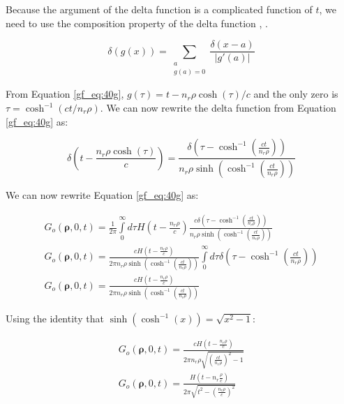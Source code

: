 Because the argument of the delta function is a complicated function of $t$, we need to use the composition property of the delta function \cite{arfken_weber}, \cite{gbur_math}.

 \begin{equation}
\delta\left(g(x) \right) = \sum_{\substack{a \\g(a)=0}}\frac{\delta(x-a)}{|g'(a)|}
\label{gf_eq:40h}
\end{equation}
 \renewcommand{\baselinestretch}{2} \small\normalsize
 
From Equation \ref{gf_eq:40g}, $g(\tau) = t - n_r\rho\cosh(\tau)/c$ and the only zero  is $\tau = \cosh^{-1}\left(ct/n_r\rho\right)$. We can now rewrite the delta function from Equation \ref{gf_eq:40g} as:

 \begin{equation}
\delta\left(t - \frac{n_r\rho \cosh(\tau)}{c}\right) = \frac{\delta\left(\tau -\cosh^{-1}\left(\frac{ct}{n_r\rho} \right) \right)}{n_r\rho\sinh\left(\cosh^{-1}\left(\frac{ct}{n_r\rho} \right) \right)}
\label{gf_eq:40i}
\end{equation}
 \renewcommand{\baselinestretch}{2} \small\normalsize
 
\noindent We can now rewrite Equation \ref{gf_eq:40g} as:

 \begin{equation}
 \begin{gathered}
G_o\left(\boldsymbol{\rho},0,t\right) = \frac{1}{2\pi}\int\limits_{0}^{\infty}d\tau H\left(t -\frac{n_r\rho}{c}\right)  \frac{c\delta\left(\tau -\cosh^{-1}\left(\frac{ct}{n_r\rho} \right) \right)}{n_r\rho\sinh\left(\cosh^{-1}\left(\frac{ct}{n_r\rho} \right) \right)}\\
G_o\left(\boldsymbol{\rho},0,t\right) = \frac{cH\left(t -\frac{n_r\rho}{c}\right)}{2\pi n_r\rho\sinh\left(\cosh^{-1}\left(\frac{ct}{n_r\rho} \right) \right)}\int\limits_{0}^{\infty}d\tau \delta\left(\tau -\cosh^{-1}\left(\frac{ct}{n_r\rho} \right) \right)\\
G_o\left(\boldsymbol{\rho},0,t\right) = \frac{cH\left(t -\frac{n_r\rho}{c}\right)}{2\pi n_r\rho\sinh\left(\cosh^{-1}\left(\frac{ct}{n_r\rho} \right) \right)}
\end{gathered}
\label{gf_eq:40j}
\end{equation}
 \renewcommand{\baselinestretch}{2} \small\normalsize
 
\noindent Using the identity that $\sinh\left(\cosh^{-1}(x) \right) = \sqrt{x^2 -1}$:

 \begin{equation}
 \begin{gathered}
G_o\left(\boldsymbol{\rho},0,t\right) = \frac{cH\left(t -\frac{n_r\rho}{c}\right)}{2\pi n_r\rho\sqrt{\left(\frac{ct}{n_r\rho} \right)^2 - 1}     }\\
G_o\left(\boldsymbol{\rho},0,t\right) = \frac{H\left(t -n_r\frac{\rho}{c}\right)}{2\pi \sqrt{t^2 - \left(\frac{n_r\rho}{c}\right)^2}     }
\end{gathered}
\label{gf_eq:40k}
\end{equation}
 \renewcommand{\baselinestretch}{2} \small\normalsize
 
